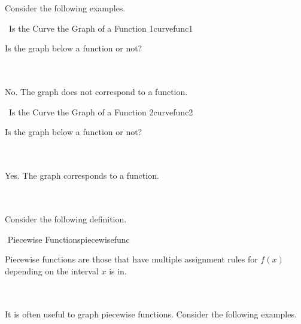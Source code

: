 		\pagebreak
		\vphantom
		\\
		\\
		Consider the following examples.
		\begin{example}{\Difficulty\,\Difficulty\,\,Is the Curve the Graph of a Function 1}{curvefunc1}
			
			Is the graph below a function or not?
			\begin{center}
			\end{center}
			\vphantom
			\\
			\\
			No. The graph does not correspond to a function.

		\end{example}
		\begin{example}{\Difficulty\,\Difficulty\,\,Is the Curve the Graph of a Function 2}{curvefunc2}

		Is the graph below a function or not?
			\begin{center}
			\end{center}
			\vphantom
			\\
			\\
			Yes. The graph corresponds to a function.
		
		\end{example}
		\pagebreak
		\vphantom
		\\
		\\
		Consider the following definition.
		\begin{definition}{\Stop\,\,Piecewise Functions}{piecewisefunc}

			Piecewise functions are those that have multiple assignment rules for \(f(x)\) depending on the interval \(x\) is in.
		
		\end{definition}
		\vphantom
		\\
		\\
		It is often useful to graph piecewise functions. Consider the following examples.
